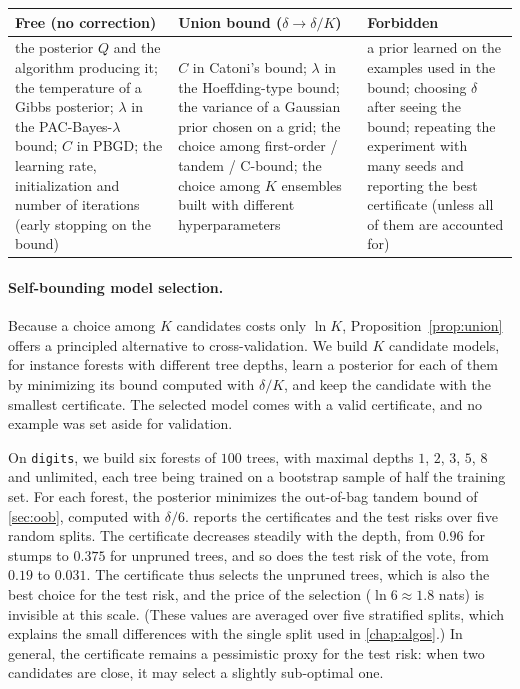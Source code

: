 \begin{center}
\renewcommand{\arraystretch}{1.3}
\begin{tabular}{p{4.6cm}p{4.2cm}p{4.2cm}}
\toprule
\textbf{Free} (no correction) & \textbf{Union bound} ($\delta\to\delta/K$) & \textbf{Forbidden} \\
\midrule
\small the posterior $Q$ and the algorithm producing it; the temperature of a Gibbs posterior; $\lambda$ in the PAC-Bayes-$\lambda$ bound; $C$ in PBGD; the learning rate, initialization and number of iterations (early stopping on the bound)
&
\small $C$ in Catoni's bound; $\lambda$ in the Hoeffding-type bound; the variance of a Gaussian prior chosen on a grid; the choice among first-order / tandem / C-bound; the choice among $K$ ensembles built with different hyperparameters
&
\small a prior learned on the examples used in the bound; choosing $\delta$ after seeing the bound; repeating the experiment with many seeds and reporting the best certificate (unless all of them are accounted for) \\
\bottomrule
\end{tabular}
\end{center}

\paragraph{Self-bounding model selection.} Because a choice among $K$ candidates
costs only $\ln K$, Proposition~\ref{prop:union} offers a principled alternative
to cross-validation. We build $K$ candidate models, for
instance forests with different tree depths, learn a posterior for each of them
by minimizing its bound computed with $\delta/K$, and keep the candidate with the
smallest certificate. The selected model comes with a valid certificate, and no
example was set aside for validation.

\begin{example}
On \texttt{digits}, we build six forests of $100$ trees, with maximal depths $1$,
$2$, $3$, $5$, $8$ and unlimited, each tree being trained on a bootstrap sample
of half the training set. For each forest, the posterior minimizes the
out-of-bag tandem bound of \cref{sec:oob}, computed with $\delta/6$.
 reports the certificates and the test risks over five
random splits. The certificate decreases steadily with the depth, from $0.96$
for stumps to $0.375$ for unpruned trees, and so does the test risk of the vote,
from $0.19$ to $0.031$. The certificate thus selects the unpruned trees, which
is also the best choice for the test risk, and the price of the selection
($\ln6\approx1.8$ nats) is invisible at this scale. (These values are averaged over five
stratified splits, which explains the small differences with the single split
used in \cref{chap:algos}.) In general, the certificate remains a pessimistic
proxy for the test risk: when two candidates are close, it may select a slightly
sub-optimal one.
\end{example}

